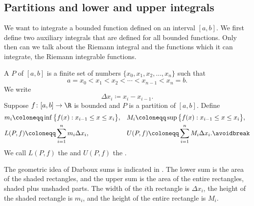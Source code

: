 \subsection{Partitions and lower and upper integrals}

We want to integrate a bounded function defined on an interval $[a,b]$.
We first define two auxiliary integrals that are defined for all
bounded functions.  Only then can we talk about the Riemann integral and
the functions which it can integrate, the Riemann integrable functions.

\begin{defn}
A \emph{} $P$ of $[a,b]$ is
a finite set of numbers $\{ x_0,x_1,x_2,\ldots,x_n \}$ such that
\begin{equation*}
a = x_0 < x_1 < x_2 < \cdots < x_{n-1} < x_n = b .
\end{equation*}
We write
\begin{equation*}
\Delta x_i \coloneqq x_i - x_{i-1} .
\end{equation*}
Suppose $f \colon [a,b] \to \R$ is bounded and $P$ is a partition of
$[a,b]$.
Define
\begin{align*}
& m_i \coloneqq \inf \, \bigl\{ f(x) : x_{i-1} \leq x \leq x_i \bigr\} , &
& M_i \coloneqq \sup \, \bigl\{ f(x) : x_{i-1} \leq x \leq x_i \bigr\} , \\
& L(P,f) \coloneqq
\sum_{i=1}^n m_i \Delta x_i , &
& U(P,f) \coloneqq
\sum_{i=1}^n M_i \Delta x_i .
\avoidbreak
\end{align*}
We call $L(P,f)$ the \emph{} and
$U(P,f)$ the \emph{}.
\end{defn}

The geometric idea of Darboux sums is indicated in
.  The lower sum is the area of the shaded
rectangles, and the upper sum is the area of the entire
rectangles, shaded plus unshaded parts.  The width of the $i$th rectangle is $\Delta x_i$,
the height of the shaded rectangle is $m_i$, and the height
of the entire rectangle is $M_i$.

\begin{myfigureht}
\caption{Sample Darboux sums.\label{darbouxfig}}
\end{myfigureht}

